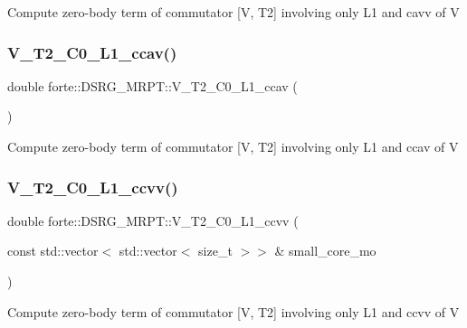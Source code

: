 Compute zero-\/body term of commutator \mbox{[}V, T2\mbox{]} involving only L1 and cavv of V \mbox{\label{classforte_1_1_d_s_r_g___m_r_p_t_a4def5a7f2c18569e16ed49015db4d804}} 
\subsubsection{\texorpdfstring{V\+\_\+\+T2\+\_\+\+C0\+\_\+\+L1\+\_\+ccav()}{V\_T2\_C0\_L1\_ccav()}}
{\footnotesize\ttfamily double forte\+::\+D\+S\+R\+G\+\_\+\+M\+R\+P\+T\+::\+V\+\_\+\+T2\+\_\+\+C0\+\_\+\+L1\+\_\+ccav (\begin{DoxyParamCaption}{ }\end{DoxyParamCaption})\hspace{0.3cm}{\ttfamily [protected]}}

Compute zero-\/body term of commutator \mbox{[}V, T2\mbox{]} involving only L1 and ccav of V \mbox{\label{classforte_1_1_d_s_r_g___m_r_p_t_a09cc4cfc50e1f42659027dd847733c1b}} 
\subsubsection{\texorpdfstring{V\+\_\+\+T2\+\_\+\+C0\+\_\+\+L1\+\_\+ccvv()}{V\_T2\_C0\_L1\_ccvv()}}
{\footnotesize\ttfamily double forte\+::\+D\+S\+R\+G\+\_\+\+M\+R\+P\+T\+::\+V\+\_\+\+T2\+\_\+\+C0\+\_\+\+L1\+\_\+ccvv (\begin{DoxyParamCaption}\item[{const std\+::vector$<$ std\+::vector$<$ size\+\_\+t $>$$>$ \&}]{small\+\_\+core\+\_\+mo }\end{DoxyParamCaption})\hspace{0.3cm}{\ttfamily [protected]}}

Compute zero-\/body term of commutator \mbox{[}V, T2\mbox{]} involving only L1 and ccvv of V 


